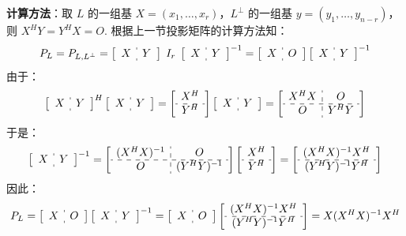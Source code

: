 \noindent\textbf{计算方法}：取 $L$ 的一组基 $X=(x_1,\ldots,x_r)$，$L^{\perp}$ 的一组基 $y=(y_1,\ldots,y_{n-r})$，则 $X^HY=Y^HX=O$.  根据上一节投影矩阵的计算方法知：
\[
    P_L=P_{L,L^\perp}
    =\left[\begin{array}{c:c}X&Y\end{array}\right]\;I_r\;\left[\begin{array}{c:c}X&Y\end{array}\right]^{-1}
    =\left[\begin{array}{c:c}X&O\end{array}\right]\left[\begin{array}{c:c}X&Y\end{array}\right]^{-1}
\]
由于：
\[
    \left[\begin{array}{c:c}X&Y\end{array}\right]^{H}\left[\begin{array}{c:c}X&Y\end{array}\right]=\left[\begin{array}{c}X^H\\\hdashline Y^H\end{array}\right]\left[\begin{array}{c:c}X&Y\end{array}\right]=\left[\begin{array}{c:c}X^HX&O\\\hdashline O&Y^HY\end{array}\right]
\]
于是：
\[
    \left[\begin{array}{c:c}X&Y\end{array}\right]^{-1}=\left[\begin{array}{c:c}(X^HX)^{-1}&O\\\hdashline O&(Y^HY)^{-1}\end{array}\right]\left[\begin{array}{c}X^H\\\hdashline Y^H\end{array}\right]=\left[\begin{array}{c}(X^HX)^{-1}X^H\\\hdashline(Y^HY)^{-1}Y^H\end{array}\right]
\]
因此：
\[
    P_L=\left[\begin{array}{c:c}X&O\end{array}\right]\left[\begin{array}{c:c}X&Y\end{array}\right]^{-1}=\left[\begin{array}{c:c}X&O\end{array}\right]\left[\begin{array}{c}(X^HX)^{-1}X^H\\\hdashline(Y^HY)^{-1}Y^H\end{array}\right]=X(X^HX)^{-1}X^H
\]

